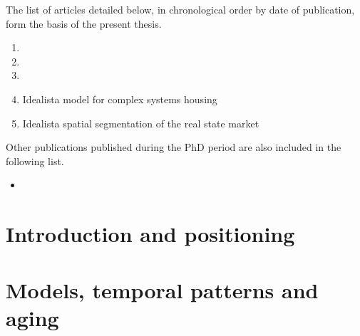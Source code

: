 \documentclass[
	11pt, %
	a4paper,
]{LegrandOrangeBook}
\begin{document}
The list of articles detailed below, in chronological order by date of publication, form the basis of the present thesis.
\vspace{0.5 cm}

\begin{enumerate}
	\item {}
	\vspace{0.5 cm}
	\item {}
	\vspace{0.5 cm}
	\item {}
	\vspace{0.5 cm}
	\item Idealista model for complex systems housing
	\vspace{0.5 cm}
	\item Idealista spatial segmentation of the real state market
	\vspace{0.5 cm}
\end{enumerate}

\vspace{0.5 cm}
Other publications published during the PhD period are also included in the following list.

\vspace{0.5 cm}
\begin{itemize}
	\item {}
	\vspace{0.5 cm}
\end{itemize}

\chapterspaceabove{6.75cm}
\chapterspacebelow{7.25cm}

\chapter{Introduction and positioning}


\chapterspaceabove{6.75cm}
\chapterspacebelow{7.25cm}

\chapter{Models, temporal patterns and aging}

\end{document}
